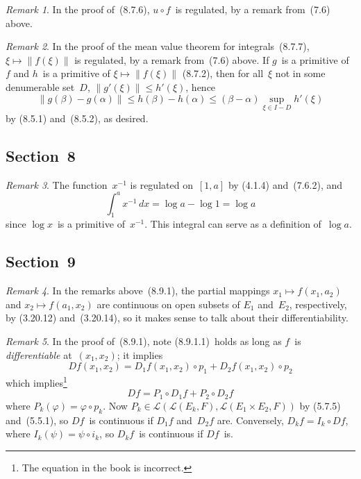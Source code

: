 \documentclass[letterpaper,12pt]{article}
\renewcommand{\L}{\mathcal{L}}
\newcommand{\after}{\circ}
\newcommand{\inv}[1]{#1^{-1}}
\newcommand{\norm}[1]{\lVert{#1}\rVert}
\renewcommand{\d}[1]{\,d\!{#1}}
\newcommand{\dx}{\d{x}}
\theoremstyle{plain}
\theoremstyle{definition}
\theoremstyle{remark}
\newtheorem*{rmk}{Remark}
\begin{document}
\begin{rmk}
In the proof of~(8.7.6), \(u\after f\)~is regulated, by a remark from~(7.6) above.
\end{rmk}

\begin{rmk}
In the proof of the mean value theorem for integrals~(8.7.7), \(\xi\mapsto\norm{f(\xi)}\) is regulated, by a remark from~(7.6) above. If \(g\)~is a primitive of~\(f\) and \(h\)~is a primitive of \(\xi\mapsto\norm{f(\xi)}\) (8.7.2), then for all~\(\xi\) not in some denumerable set~\(D\), \(\norm{g'(\xi)}\le h'(\xi)\), hence
\[\norm{g(\beta)-g(\alpha)}\le h(\beta)-h(\alpha)\le(\beta-\alpha)\sup_{\xi\in I-D} h'(\xi)\]
by (8.5.1) and~(8.5.2), as desired.
\end{rmk}

\subsection*{Section~8}
\begin{rmk}
The function~\(\inv{x}\) is regulated on~\([1,a]\) by (4.1.4) and~(7.6.2), and
\[\int_1^a\inv{x}\dx=\log a-\log 1=\log a\]
since \(\log x\)~is a primitive of~\(\inv{x}\). This integral can serve as a definition of~\(\log a\).
\end{rmk}

\subsection*{Section~9}
\begin{rmk}
In the remarks above~(8.9.1), the partial mappings \(x_1\mapsto f(x_1,a_2)\) and \(x_2\mapsto f(a_1,x_2)\) are continuous on open subsets of \(E_1\) and~\(E_2\), respectively, by (3.20.12) and~(3.20.14), so it makes sense to talk about their differentiability.
\end{rmk}

\begin{rmk}
In the proof of~(8.9.1), note (8.9.1.1)~holds as long as \(f\)~is \emph{differentiable} at~\((x_1,x_2)\); it implies
\[Df(x_1,x_2)=D_1f(x_1,x_2)\after p_1+D_2f(x_1,x_2)\after p_2\]
which implies\footnote{The equation in the book is incorrect.}
\[Df=P_1\after D_1f+P_2\after D_2f\]
where \(P_k(\varphi)=\varphi\after p_k\). Now \(P_k\in\L(\L(E_k,F),\L(E_1\times E_2,F))\) by (5.7.5) and~(5.5.1), so \(Df\)~is continuous if \(D_1f\) and~\(D_2f\) are. Conversely, \(D_kf=I_k\after Df\), where \(I_k(\psi)=\psi\after i_k\), so \(D_kf\)~is continuous if \(Df\)~is.
\end{rmk}
\end{document}
